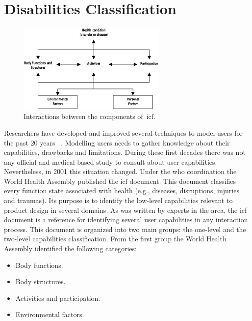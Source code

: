 \ifpdf
    \graphicspath{{9_backmatter/figures/PNG/}{9_backmatter/figures/PDF/}{9_backmatter/figures/}}
\fi


\chapter{Disabilities Classification}
\label{cha:appendixA}

\begin{figure}
\centering
\includegraphics[width=0.65\textwidth]{icf_interaction.png}
\caption{Interactions between the components of~\ac{icf}.}
\label{fig:icf_interaction}
\end{figure}

Researchers have developed and improved several techniques to model users for 
the past 20 years~\citep{petrelli_user_centered_1999} \citep{fink_adaptable_1997}. 
Modelling users needs to gather knowledge about their capabilities, drawbacks and 
limitations. During these first decades there was not any official and medical-based 
study to consult about user capabilities. Nevertheless, in 2001 this situation 
changed. Under the \ac{who} coordination the World Health Assembly published the
\ac{icf} document. This document classifies every function state associated with 
health (e.g., diseases, disruptions, injuries and traumas). Its purpose is to 
identify the low-level capabilities relevant to product design in several 
domains. As was written by experts in the area, the \ac{icf} document is a 
reference for identifying several user capabilities in any interaction process. 
This document is organized into two main groups: the one-level and the two-level 
capabilities classification. From the first group the World Health Assembly 
identified the following categories:

\begin{itemize}
  \item Body functions.
  \item Body structures.
  \item Activities and participation.
  \item Environmental factors.
\end{itemize}

